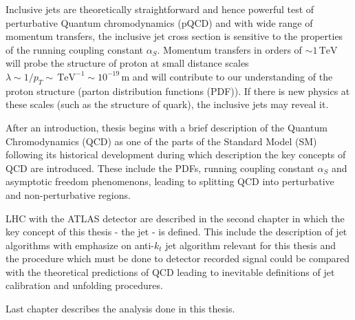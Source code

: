 \documentclass[a4paper,11pt,twoside,openright]{book}
\newcommand{\TeV}{\,\text{TeV}}
\newcommand{\pt}{p_{T}}
\begin{document}
Inclusive jets are theoretically straightforward and hence powerful test of
perturbative Quantum chromodynamics (pQCD) and with wide range of 
momentum transfers, the inclusive jet cross section is sensitive to the
properties of the running coupling constant $\alpha_S$.  Momentum transfers in
orders of $\sim 1 \TeV$ will probe the structure of proton at small distance
scales $\lambda \sim 1 / \pt \sim \TeV^{-1} \sim 10^{-19} \, \text{m}$ and will
contribute to our understanding of the proton structure (parton distribution
functions (PDF)). If there is new physics at these scales (such as the
structure of quark), the inclusive jets may reveal it.

After an introduction, thesis begins with a brief description of the Quantum
Chromodynamics (QCD) as one of the parts of the Standard Model (SM) following
its historical development during which description the key concepts of QCD are
introduced.  These include the PDFs, running coupling constant $\alpha_S$ and
asymptotic freedom phenomenons, leading to splitting QCD into perturbative and
non-perturbative regions. 

LHC with the ATLAS detector are described in the second chapter in which the key
concept of this thesis - the jet - is defined. This include the description of
jet algorithms with emphasize on anti-$k_t$ jet algorithm relevant for this
thesis and the procedure which must be done to detector recorded signal
could be compared with the theoretical predictions of QCD leading to inevitable
definitions of jet calibration and unfolding procedures. 

Last chapter describes the analysis done in this thesis.








\clearpage
{}



\cleardoublepage
\end{document}

